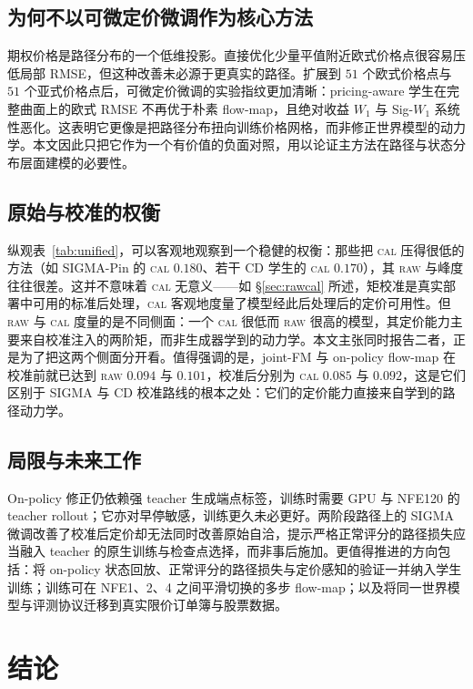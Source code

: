 \documentclass[11pt]{ctexart}
\newcommand{\raw}{\textsc{raw}}
\newcommand{\caltext}{\textsc{cal}}
\begin{document}
\subsection{为何不以可微定价微调作为核心方法}
期权价格是路径分布的一个低维投影。直接优化少量平值附近欧式价格点很容易压低局部 RMSE，但这种改善未必源于更真实的路径。扩展到 $51$ 个欧式价格点与 $51$ 个亚式价格点后，可微定价微调的实验指纹更加清晰：pricing-aware 学生在完整曲面上的欧式 RMSE 不再优于朴素 flow-map，且绝对收益 $W_1$ 与 Sig-$W_1$ 系统性恶化。这表明它更像是把路径分布扭向训练价格网格，而非修正世界模型的动力学。本文因此只把它作为一个有价值的负面对照，用以论证主方法在路径与状态分布层面建模的必要性。

\subsection{原始与校准的权衡}
\label{sec:tradeoff}
纵观表~\ref{tab:unified}，可以客观地观察到一个稳健的权衡：那些把 \caltext{} 压得很低的方法（如 SIGMA-Pin 的 \caltext{} $0.180$、若干 CD 学生的 \caltext{} $0.170$），其 \raw{} 与峰度往往很差。这并不意味着 \caltext{} 无意义——如 \S\ref{sec:rawcal} 所述，矩校准是真实部署中可用的标准后处理，\caltext{} 客观地度量了模型经此后处理后的定价可用性。但 \raw{} 与 \caltext{} 度量的是不同侧面：一个 \caltext{} 很低而 \raw{} 很高的模型，其定价能力主要来自校准注入的两阶矩，而非生成器学到的动力学。本文主张同时报告二者，正是为了把这两个侧面分开看。值得强调的是，joint-FM 与 on-policy flow-map 在校准前就已达到 \raw{} $0.094$ 与 $0.101$，校准后分别为 \caltext{} $0.085$ 与 $0.092$，这是它们区别于 SIGMA 与 CD 校准路线的根本之处：它们的定价能力直接来自学到的路径动力学。

\subsection{局限与未来工作}
On-policy 修正仍依赖强 teacher 生成端点标签，训练时需要 GPU 与 NFE120 的 teacher rollout；它亦对早停敏感，训练更久未必更好。两阶段路径上的 SIGMA 微调改善了校准后定价却无法同时改善原始自洽，提示严格正常评分的路径损失应当融入 teacher 的原生训练与检查点选择，而非事后施加。更值得推进的方向包括：将 on-policy 状态回放、正常评分的路径损失与定价感知的验证一并纳入学生训练；训练可在 NFE1、2、4 之间平滑切换的多步 flow-map；以及将同一世界模型与评测协议迁移到真实限价订单簿与股票数据。

\section{结论}
\label{sec:conclusion}
\end{document}
